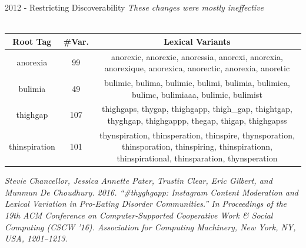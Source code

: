 \documentclass[nobackground,dvipsnames,table,aspectratio=169]{beamer}
\begin{document}
\begin{frame}{2012 - Restricting Discoverability}
    \textit{These changes were mostly ineffective}\\~\\
    \begin{tabular}{|c|c|c|}%
         \hline
         \textbf{Root Tag} & \textbf{\#Var.} & \textbf{Lexical Variants}\\
         \hline
         anorexia & 99 & anorexic, anorexie, anoressia, anorexi, anorexia, anorexique, anorexica, anorectic, anorexia, anoretic\\
         \hline
         bulimia & 49 & bulimic, bulima, bulimie, bulimi, bulimia, bulimica, bulimc, bulimiaaa, bulimic, bulimist\\
         \hline
         thighgap & 107 & thighgaps, thygap, thighgapp, thigh_gap, thightgap, thyghgap, thighgappp, thegap, thigap, thighgapss\\
         \hline
         thinspiration & 101 & thynspiration, thinsperation, thinspire, thynsporation, thinsporation, thinspiring, thinspirationn, thinspirational, thinsparation, thynsperation\\
         \hline
    \end{tabular}
    \tiny
    \textit{Stevie Chancellor, Jessica Annette Pater, Trustin Clear, Eric Gilbert, and Munmun De Choudhury. 2016. “\#thyghgapp: Instagram Content Moderation and Lexical Variation in Pro-Eating Disorder Communities.” In Proceedings of the 19th ACM Conference on Computer-Supported Cooperative Work \& Social Computing (CSCW '16). Association for Computing Machinery, New York, NY, USA, 1201–1213.}
\end{frame}
\end{document}
